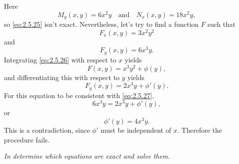 \begin{solution}
Here
\[
M_y(x,y)=6x^2y \quad\text{and}\quad N_x(x,y)=18x^2y,
\]
so \eqref{eq:2.5.25} isn't  exact. Nevertheless,  let's try to find
a function $F$ such that
\begin{equation} \label{eq:2.5.26}
F_x(x,y)=3x^2y^2
\end{equation}
and
\begin{equation} \label{eq:2.5.27}
F_y(x,y)=6x^3y.
\end{equation}
Integrating \eqref{eq:2.5.26} with respect to $x$ yields
\[
F(x,y)=x^3y^2+\phi(y),
\]
and differentiating this with respect to $y$ yields
\[
F_y(x,y)=2x^3y+\phi'(y).
\]
For this equation to be consistent with \eqref{eq:2.5.27},
\[
6x^3y=2x^3y+\phi'(y),
\]
or
\[
\phi'(y)=4x^3y.
\]
This is a contradiction, since $\phi'$  must be independent
of $x$. Therefore the procedure fails.
\end{solution}

\exercises
\emph{In  determine which equations
are exact and solve them.}

